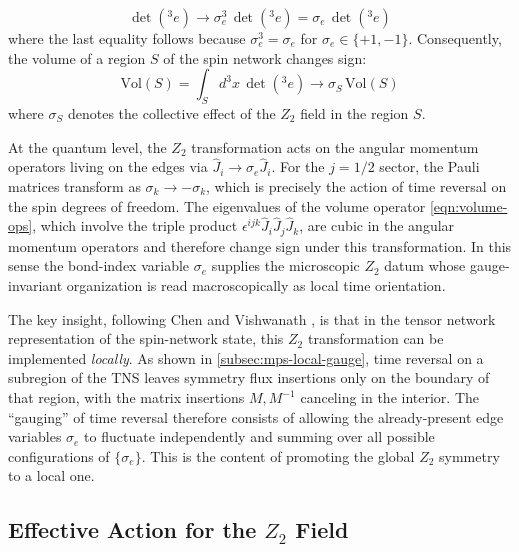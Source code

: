 \documentclass[preprint]{SciPost}
\theoremstyle{plain} %
\begin{document}
\begin{equation}\label{eqn:z2-det-flip}
	\det({}^3 e) \rightarrow \sigma_e^3 \, \det({}^3 e) = \sigma_e \, \det({}^3 e)
\end{equation}
where the last equality follows because $ \sigma_e^3 = \sigma_e $ for $ \sigma_e \in \{+1, -1\} $. Consequently, the volume of a region $ S $ of the spin network changes sign:
\begin{equation}\label{eqn:z2-volume-flip}
	\text{Vol}(S) = \int_S d^3 x \, \det({}^3 e) \rightarrow \sigma_S \, \text{Vol}(S)
\end{equation}
where $ \sigma_S $ denotes the collective effect of the $ Z_2 $ field in the region $ S $.

At the quantum level, the $ Z_2 $ transformation acts on the angular momentum operators living on the edges via $ \hat J_i \rightarrow \sigma_e \hat J_i $. For the $ j = 1/2 $ sector, the Pauli matrices transform as $ \sigma_k \rightarrow -\sigma_k $, which is precisely the action of time reversal on the spin degrees of freedom. The eigenvalues of the volume operator \eqref{eqn:volume-ops}, which involve the triple product $ \epsilon^{ijk} \hat J_i \hat J_j \hat J_k $, are cubic in the angular momentum operators and therefore change sign under this transformation. In this sense the bond-index variable $\sigma_e$ supplies the microscopic $Z_2$ datum whose gauge-invariant organization is read macroscopically as local time orientation.

The key insight, following Chen and Vishwanath \cite{Chen2015Gauging}, is that in the tensor network representation of the spin-network state, this $ Z_2 $ transformation can be implemented \emph{locally}. As shown in \autoref{subsec:mps-local-gauge}, time reversal on a subregion of the TNS leaves symmetry flux insertions only on the boundary of that region, with the matrix insertions $ M, M^{-1} $ canceling in the interior. The ``gauging'' of time reversal therefore consists of allowing the already-present edge variables $ \sigma_e $ to fluctuate independently and summing over all possible configurations of $ \{\sigma_e\} $. This is the content of promoting the global $ Z_2 $ symmetry to a local one.

\subsection{Effective Action for the $ Z_2 $ Field}\label{subsec:z2-effective-action}
\end{document}
